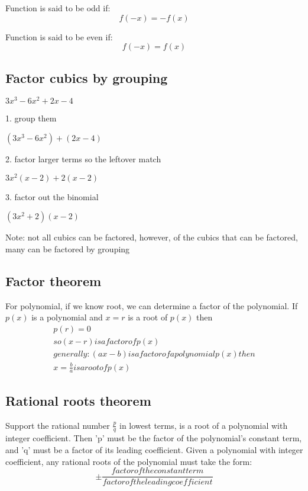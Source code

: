 \documentclass{article}
\begin{document}
Function is said to be odd if:
\begin{equation}
  f(-x) = -f(x)
\end{equation}

Function is said to be even if:
\begin{equation}
  f(-x) = f(x)
\end{equation}
\subsection{Factor cubics by grouping}

$3x^3-6x^2+2x-4$

1. group them

$(3x^3-6x^2)+(2x-4)$

2. factor larger terms so the leftover match

$3x^2(x-2)+2(x-2)$

3. factor out the binomial

$(3x^2+2)(x-2)$

Note: not all cubics can be factored, however,
of the cubics that can be factored,
many can be factored by grouping

\subsection{Factor theorem}
For polynomial, if we know root, we can determine a factor of the
polynomial. If $p(x)$ is a polynomial and $x=r$ is a root of $p(x)$ then
\begin{equation}
  \begin{gathered}
  p(r) = 0 \\
  so (x-r) is a factor of p(x) \\
  generally: (ax-b) is a factor of a polynomial p(x) then \\
  x = \frac{b}{a} is a root of p(x)
\end{gathered}
\end{equation}

\subsection{Rational roots theorem}
Support the rational number $\frac{p}{q}$ in lowest terms, is a root of a polynomial
with integer coefficient.
Then 'p' must be the factor of the polynomial's constant term, and 'q' must be a factor
of its leading coefficient.
Given a polynomial with integer coefficient, any rational roots of the polynomial must take the
form:
\begin{equation}
  \pm \frac{factor of the constant term}{factor of the leading coefficient}
\end{equation}
\end{document}

